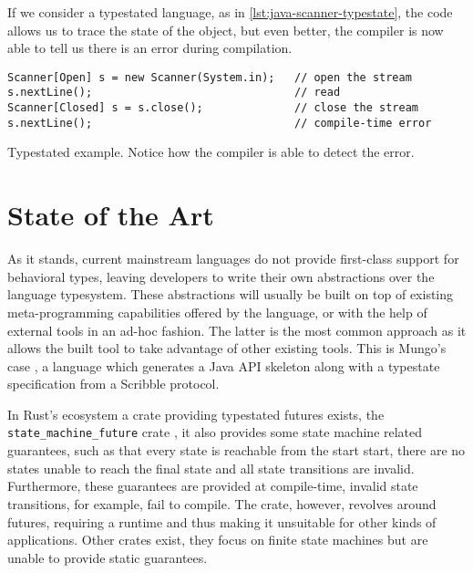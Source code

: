 If we consider a typestated language, as in \autoref{lst:java-scanner-typestate},
the code allows us to trace the state of the object, but even better,
the compiler is now able to tell us there is an error during compilation.

\begin{listing}
    \begin{verbatim}
Scanner[Open] s = new Scanner(System.in);   // open the stream
s.nextLine();                               // read
Scanner[Closed] s = s.close();              // close the stream
s.nextLine();                               // compile-time error
    \end{verbatim}
    \caption{
        Typestated  example.
        Notice how the compiler is able to detect the error.
    }
    \label{lst:java-scanner-typestate}
\end{listing}

\section{State of the Art}\label{sec:state-of-the-art}

As it stands, current mainstream languages do not provide first-class support for behavioral types,
leaving developers to write their own abstractions over the language typesystem.
These abstractions will usually be built on top of existing meta-programming capabilities offered by the language,
or with the help of external tools in an ad-hoc fashion.
The latter is the most common approach as it allows the built tool to take advantage of other existing tools.
This is Mungo's case \autocite{Kouzapas2018, Voinea2020},
a language which generates a Java API skeleton along with a typestate specification from a
Scribble \autocite{Yoshida2014} protocol.

In Rust's ecosystem a crate providing typestated futures exists, the \texttt{state\_machine\_future} crate \autocite{Fitzgerald2019},
it also provides some state machine related guarantees, such as that every state is reachable from the start start,
there are no states unable to reach the final state and all state transitions are invalid.
Furthermore, these guarantees are provided at compile-time, invalid state transitions, for example, fail to compile.
The crate, however, revolves around futures, requiring a runtime and thus making it unsuitable for other kinds of applications.
Other crates exist, they focus on finite state machines but are unable to provide static guarantees.

